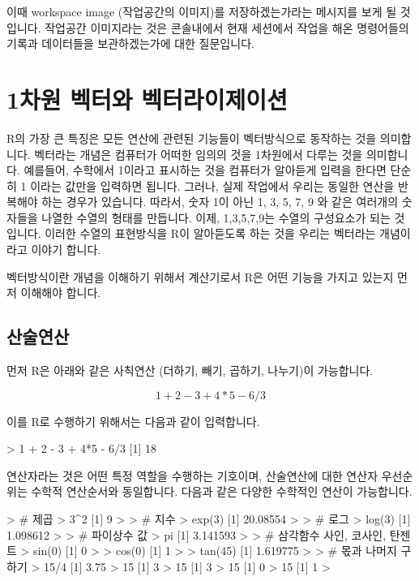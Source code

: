\documentclass{book}
\begin{document}
이때 workspace image (작업공간의 이미지)를 저장하겠는가라는 메시지를 보게 될 것입니다. 
작업공간 이미지라는 것은 콘솔내에서 현재 세션에서 작업을 해온 명령어들의 기록과 데이터들을 보관하겠는가에 대한 질문입니다. 

\section{1차원 벡터와 벡터라이제이션}

R의 가장 큰 특징은 모든 연산에 관련된 기능들이 벡터방식으로 동작하는 것을 의미합니다. 
벡터라는 개념은 컴퓨터가 어떠한 임의의 것을 1차원에서 다루는 것을 의미합니다.
예를들어, 수학에서 1이라고 표시하는 것을 컴퓨터가 알아듣게 입력을 한다면 단순히 1 이라는 값만을 입력하면 됩니다. 
그러나, 실제 작업에서 우리는 동일한 연산을 반복해야 하는 경우가 있습니다. 
따라서, 숫자 1이 아닌 1, 3, 5, 7, 9 와 같은 여러개의 숫자들을 나열한 수열의 형태를 만듭니다. 
이제, 1,3,5,7,9는 수열의 구성요소가 되는 것입니다. 
이러한 수열의 표현방식을 R이 알아듣도록 하는 것을 우리는 벡터라는 개념이라고 이야기 합니다. 

벡터방식이란 개념을 이해하기 위해서 계산기로서 R은 어떤 기능을 가지고 있는지 먼저 이해해야 합니다.

\subsection{산술연산}

먼저 R은 아래와 같은 사칙연산 (더하기, 빼기, 곱하기, 나누기)이 가능합니다. 

\begin{equation}
1 + 2 - 3 + 4*5 - 6/3
\end{equation}

이를 R로 수행하기 위해서는 다음과 같이 입력합니다. 

\begin{Schunk}
	\begin{Soutput}
> 1 + 2 - 3 + 4*5 - 6/3
[1] 18
	\end{Soutput}
\end{Schunk}

연산자라는 것은 어떤 특정 역할을 수행하는 기호이며, 산술연산에 대한  연산자 우선순위는 수학적 연산순서와 동일합니다. 
다음과 같은 다양한 수학적인 연산이 가능합니다. 

\begin{Schunk}
	\begin{Soutput}
> # 제곱 
> 3^2
[1] 9
>
> # 지수 
> exp(3)
[1] 20.08554
> 
> # 로그 
> log(3)
[1] 1.098612
> 
> # 파이상수 값 
> pi
[1] 3.141593
>
> # 삼각함수 사인, 코사인, 탄젠트  
> sin(0)
[1] 0
>
> cos(0)
[1] 1
>
> tan(45)
[1] 1.619775
> 
> # 몫과 나머지 구하기 
> 15/4
[1] 3.75
> 15 %
[1] 3
> 15 %
[1] 3
> 15 %
[1] 0
> 15 %
[1] 1
> 
\end{Soutput}
\end{Schunk}
\end{document}
